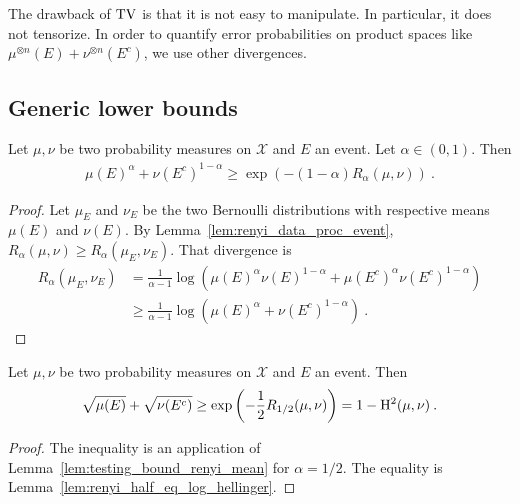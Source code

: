 The drawback of $\operatorname{TV}$ is that it is not easy to manipulate. In particular, it does not tensorize. In order to quantify error probabilities on product spaces like $\mu^{\otimes n}(E) + \nu^{\otimes n}(E^c)$, we use other divergences.

\subsection{Generic lower bounds}

\begin{lemma}
  \label{lem:testing_bound_renyi_mean}
  Let $\mu, \nu$ be two probability measures on $\mathcal X$ and $E$ an event. Let $\alpha \in (0,1)$. Then
  \begin{align*}
  \mu(E)^\alpha + \nu(E^c)^{1 - \alpha}
  \ge \exp\left(-(1 - \alpha) R_{\alpha}(\mu, \nu)\right)
  \: .
  \end{align*}
\end{lemma}

\begin{proof}
Let $\mu_E$ and $\nu_E$ be the two Bernoulli distributions with respective means $\mu(E)$ and $\nu(E)$.
By Lemma~\ref{lem:renyi_data_proc_event}, $R_\alpha(\mu, \nu) \ge R_\alpha(\mu_E, \nu_E)$. That divergence is
\begin{align*}
R_\alpha(\mu_E, \nu_E)
&= \frac{1}{\alpha - 1}\log \left(\mu(E)^\alpha \nu(E)^{1 - \alpha}
  + \mu(E^c)^\alpha \nu(E^c)^{1 - \alpha}\right)
\\
&\ge \frac{1}{\alpha - 1}\log \left(\mu(E)^\alpha + \nu(E^c)^{1 - \alpha}\right)
\: .
\end{align*}
\end{proof}

\begin{corollary}
  \label{cor:testing_bound_hellinger}
  Let $\mu, \nu$ be two probability measures on $\mathcal X$ and $E$ an event. Then
  \begin{align*}
  \sqrt{\mu(E)} + \sqrt{\nu(E^c)}
  \ge \exp\left(-\frac{1}{2} R_{1/2}(\mu, \nu)\right)
  = 1 - \operatorname{H^2}(\mu, \nu)
  \: .
  \end{align*}
\end{corollary}

\begin{proof}
The inequality is an application of Lemma~\ref{lem:testing_bound_renyi_mean} for $\alpha = 1/2$. The equality is Lemma~\ref{lem:renyi_half_eq_log_hellinger}.
\end{proof}

